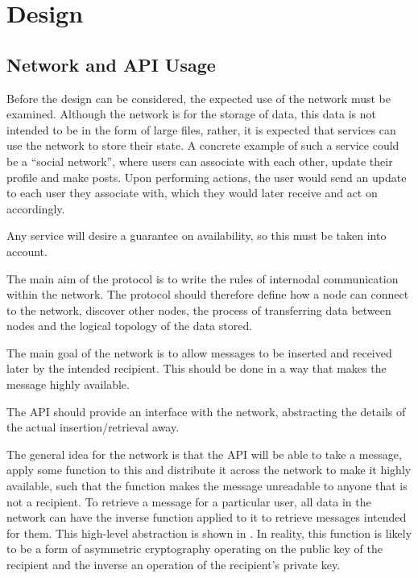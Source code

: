\section{Design} \label{design}

	\subsection{Network and API Usage}

	Before the design can be considered, the expected use of the network must be examined. Although the network is for the storage of data, this data is not intended to be in the form of large files, rather, it is expected that services can use the network to store their state. A concrete example of such a service could be a ``social network'', where users can associate with each other, update their profile and make posts. Upon performing actions, the user would send an update to each user they associate with, which they would later receive and act on accordingly.

	Any service will desire a guarantee on availability, so this must be taken into account.

	The main aim of the protocol is to write the rules of internodal communication within the network. The protocol should therefore define how a node can connect to the network, discover other nodes, the process of transferring data between nodes and the logical topology of the data stored.

	The main goal of the network is to allow messages to be inserted and received later by the intended recipient. This should be done in a way that makes the message highly available.

	The API should provide an interface with the network, abstracting the details of the actual insertion/retrieval away.

	The general idea for the network is that the API will be able to take a message, apply some function to this and distribute it across the network to make it highly available, such that the function makes the message unreadable to anyone that is not a recipient. To retrieve a message for a particular user, all data in the network can have the inverse function applied to it to retrieve messages intended for them. This high-level abstraction is shown in . In reality, this function is likely to be a form of asymmetric cryptography operating on the public key of the recipient and the inverse an operation of the recipient's private key.
	
